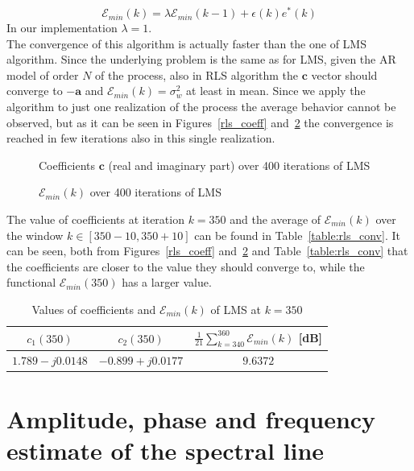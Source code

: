 \documentclass[10pt]{article}
\numberwithin{equation}{section}
\begin{document}
\begin{equation}
  \mathcal{E}_{min}(k) = \lambda \mathcal{E}_{min}(k-1) + \epsilon(k)e^*(k)
\end{equation}
In our implementation $\lambda = 1$. \\
The convergence of this algorithm is actually faster than the one of LMS algorithm. Since the underlying problem is the same as for LMS, given the AR model of order $N$ of the process, also in RLS algorithm the $\mathbf{c}$ vector should converge to $-\mathbf{a}$ and $\mathcal{E}_{min}(k) = \sigma_w^2$ at least in mean. Since we apply the algorithm to just one realization of the process the average behavior cannot be observed, but as it can be seen in Figures~\ref{rls_coeff} and~\ref{fig:err_rls} the convergence is reached in few iterations also in this single realization.

\begin{figure}[h!]
  \caption{Coefficients $\mathbf{c}$ (real and imaginary part) over 400 iterations of LMS}
  \label{fig:coeff_rls}
\end{figure}

\begin{figure}[h!]

  \caption{$\mathcal{E}_{min}(k)$ over 400 iterations of LMS}
  \label{fig:err_rls}
\end{figure}

The value of coefficients at iteration $k = 350$ and the average of $\mathcal{E}_{min}(k)$ over the window $k \in [350 - 10, 350 + 10]$ can be found in Table~\ref{table:rls_conv}. It can be seen, both from Figures~\ref{rls_coeff} and~\ref{fig:err_rls} and Table~\ref{table:rls_conv} that the coefficients are closer to the value they should converge to, while the functional $\mathcal{E}_{min}(350)$ has a larger value.

\begin{table}[h!]
  \centering
  \begin{tabular}{c|c|c}
    $c_1(350)$ &   $c_2(350)$ & $\frac{1}{21}\sum_{k=340}^{360} \mathcal{E}_{min}(k)$ [dB] \\ \hline
    $1.789 - j0.0148$ & $-0.899 + j0.0177$ & $9.6372$
  \end{tabular}
  \caption{Values of coefficients and $\mathcal{E}_{min}(k)$ of LMS at $k=350$}
  \label{table:lms_conv}
\end{table}

\section{Amplitude, phase and frequency estimate of the spectral line}
\end{document}
